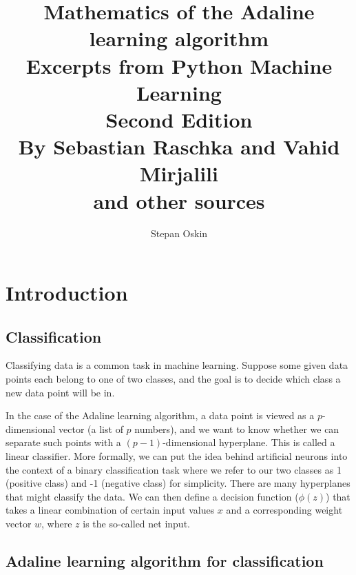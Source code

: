 \documentclass[11pt]{article}
\begin{document}
    \title{Mathematics of the Adaline learning algorithm\\
    Excerpts from Python Machine Learning \\
    Second Edition \\
    By Sebastian Raschka and Vahid Mirjalili\cite{RaschkaMirjalili2017} \\
    and other sources}

    \author{Stepan Oskin}

    \maketitle

    \begin{abstract}


    \end{abstract}

    \section{Introduction} \label{sec:ada_intro}

    \subsection{Classification} \label{subsec:classification}

    Classifying data is a common task in machine learning.
    Suppose some given data points each belong to one of two classes, and the goal is to decide which class a
    new data point will be in.

    In the case of the Adaline learning algorithm, a data point is viewed as a $p$-dimensional vector
    (a list of $p$ numbers), and we want to know whether we can separate such points with
    a $(p-1)$-dimensional hyperplane.
    This is called a linear classifier.
    More formally, we can put the idea behind artificial neurons into the context of a binary classification task where we refer to our two classes as 1 (positive class) and -1 (negative class) for simplicity.
    There are many hyperplanes that might classify the data.
    We can then define a decision function ($\phi(z)$) that takes a linear combination of certain input values $x$ and a corresponding weight vector $w$, where $z$ is the so-called net input.

    \subsection{Adaline learning algorithm for classification} \label{subsec:ada_desc}
\end{document}

